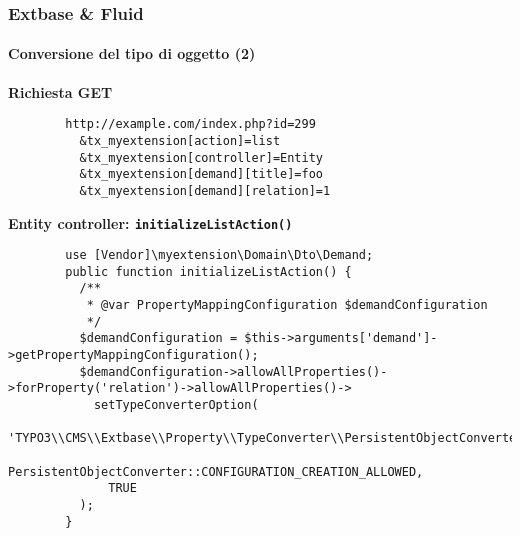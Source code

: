 
\begin{frame}[fragile]
	\frametitle{Extbase \& Fluid}
	\framesubtitle{Conversione del tipo di oggetto (2)}

	\lstset{
		basicstyle=\tiny\ttfamily
	}

	\smaller\textbf{Richiesta GET}\normalsize
	\begin{lstlisting}
		http://example.com/index.php?id=299
		  &tx_myextension[action]=list
		  &tx_myextension[controller]=Entity
		  &tx_myextension[demand][title]=foo
		  &tx_myextension[demand][relation]=1
	\end{lstlisting}

	\smaller\textbf{Entity controller: \texttt{initializeListAction()}}\normalsize
	\begin{lstlisting}
		use [Vendor]\myextension\Domain\Dto\Demand;
		public function initializeListAction() {
		  /**
		   * @var PropertyMappingConfiguration $demandConfiguration
		   */
		  $demandConfiguration = $this->arguments['demand']->getPropertyMappingConfiguration();
		  $demandConfiguration->allowAllProperties()->forProperty('relation')->allowAllProperties()->
		    setTypeConverterOption(
		      'TYPO3\\CMS\\Extbase\\Property\\TypeConverter\\PersistentObjectConverter',
		      PersistentObjectConverter::CONFIGURATION_CREATION_ALLOWED,
		      TRUE
		  );
		}
	\end{lstlisting}

\end{frame}


